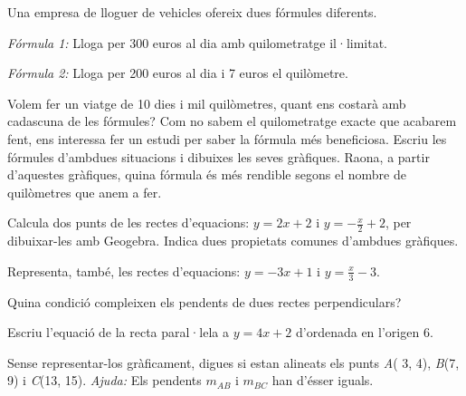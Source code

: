 \begin{mylist}
 \answers[cols=1]{[--7.6 $^\circ$C, 7020 m, $t=9-\frac{a}{180}$, $t=12-\frac{a}{180}$. Les dues funcions afins representen rectes paral·les.]}

 \exer  Una empresa de lloguer de vehicles ofereix dues fórmules diferents. 
 
 \textit{Fórmula 1:} Lloga per 300 euros al dia amb quilometratge il·limitat. 
 
 \textit{Fórmula 2:} Lloga per 200 euros al dia i 7 euros el quilòmetre. 
 
 Volem fer un viatge de 10 dies i mil quilòmetres, quant ens costarà amb cadascuna de les fórmules? Com no sabem el quilometratge exacte que acabarem fent, ens interessa fer un estudi per saber la fórmula més beneficiosa. Escriu les fórmules d'ambdues situacions i dibuixes les seves gràfiques. Raona, a partir d'aquestes gràfiques, quina fórmula és més rendible segons el nombre de quilòmetres que anem a fer.
 
 
 
\exer \ggb  Calcula dos punts de les rectes d'equacions: $y=2x+2$ i $y=-\frac{x}{2} +2$, per dibuixar-les amb Geogebra. Indica dues propietats comunes d'ambdues gràfiques. 

Representa, també, les rectes d'equacions: $y=-3x+1$ i $y=\frac{x}{3} -3$. 

Quina condició compleixen els pendents de dues rectes perpendiculars?

 
\exer  Escriu l'equació de la recta paral·lela a  $y=4x + 2$  d'ordenada en l'origen 6.


\exer  Sense representar-los gràficament, digues si estan alineats els punts \textit{A}( 3, 4), \textit{B}(7, 9) i \textit{C}(13, 15). \textit{Ajuda: } Els pendents $m_{AB}$ i $m_{BC}$ han d'ésser iguals.


\end{mylist}




